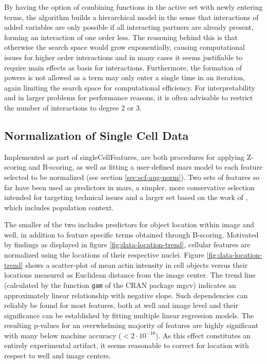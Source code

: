 By having the option of combining functions in the active set with newly entering terms, the algorithm builds a hierarchical model in the sense that interactions of added variables are only possible if all interacting partners are already present, forming an interaction of one order less. The reasoning behind this is that otherwise the search space would grow exponentially, causing computational issues for higher order interactions and in many cases it seems justifiable to require main effects as basis for interactions. Furthermore, the formation of powers is not allowed as a term may only enter a single time in an iteration, again limiting the search space for computational efficiency. For interpretability and in larger problems for performance reasons, it is often advisable to restrict the number of interactions to degree 2 or 3.

\subsection{Normalization of Single Cell Data}
Implemented as part of singleCellFeatures, are both procedures for applying Z-scoring and B-scoring, as well as fitting a user-defined \gls{mars} model to each feature selected to be normalized (see section \ref{sec:scf-aug-norm}). Two sets of features so far have been used as predictors in \gls{mars}, a simpler, more conservative selection intended for targeting technical issues and a larger set based on the work of \cite{Knapp2011}, which includes population context.



The smaller of the two includes predictors for object location within image and well, in addition to feature specific terms obtained through B-scoring. Motivated by findings as displayed in figure \ref{fig:data-location-trend}, cellular features are normalized using the locations of their respective nuclei. Figure \ref{fig:data-location-trend} shows a scatter-plot of mean actin intensity in cell objects versus their locations measured as Euclidean distance from the image center. The trend line (calculated by the function \texttt{gam} of the CRAN package mgcv) indicates an approximately linear relationship with negative slope. Such dependencies can reliably be found for most features, both at well and image level and their significance can be established by fitting multiple linear regression models. The resulting p-values for an overwhelming majority of features are highly significant with many below machine accuracy ($<2\cdot10^{-16}$). As this effect constitutes an entirely experimental artifact, it seems reasonable to correct for location with respect to well and image centers.

